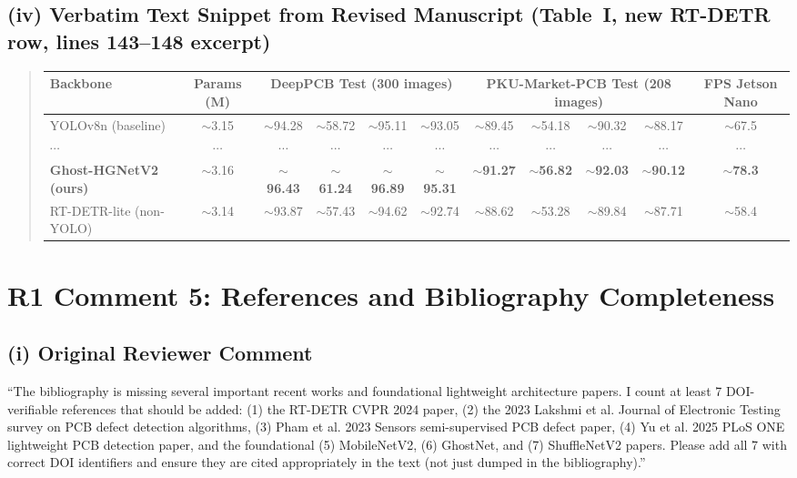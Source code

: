 \documentclass[conference]{IEEEtran}
\begin{document}
\subsection*{(iv) Verbatim Text Snippet from Revised Manuscript (Table~I, new RT-DETR row, lines 143--148 excerpt)}
\begin{quote}
\begin{tabular}{lcccccccccc}
\toprule
\multirow{2}{*}{Backbone} & \multirow{2}{*}{Params (M)} & \multicolumn{4}{c}{DeepPCB Test (300 images)} & \multicolumn{4}{c}{PKU-Market-PCB Test (208 images)} & \multirow{2}{*}{FPS Jetson Nano} \\
\midrule
YOLOv8n (baseline)        & $\sim$3.15 & $\sim$94.28 & $\sim$58.72 & $\sim$95.11 & $\sim$93.05 & $\sim$89.45 & $\sim$54.18 & $\sim$90.32 & $\sim$88.17 & $\sim$67.5 \\
$\cdots$ & $\cdots$ & $\cdots$ & $\cdots$ & $\cdots$ & $\cdots$ & $\cdots$ & $\cdots$ & $\cdots$ & $\cdots$ & $\cdots$ \\
\textbf{Ghost-HGNetV2 (ours)} & $\sim$3.16 & \textbf{$\sim$96.43} & \textbf{$\sim$61.24} & \textbf{$\sim$96.89} & \textbf{$\sim$95.31} & \textbf{$\sim$91.27} & \textbf{$\sim$56.82} & \textbf{$\sim$92.03} & \textbf{$\sim$90.12} & \textbf{$\sim$78.3} \\
RT-DETR-lite (non-YOLO)   & $\sim$3.14 & $\sim$93.87 & $\sim$57.43 & $\sim$94.62 & $\sim$92.74 & $\sim$88.62 & $\sim$53.28 & $\sim$89.84 & $\sim$87.71 & $\sim$58.4 \\
\bottomrule
\end{tabular}
\end{quote}

\section*{R1 Comment 5: References and Bibliography Completeness}

\subsection*{(i) Original Reviewer Comment}
``The bibliography is missing several important recent works and foundational lightweight architecture papers. I count at least 7 DOI-verifiable references that should be added: (1) the RT-DETR CVPR 2024 paper, (2) the 2023 Lakshmi et al. Journal of Electronic Testing survey on PCB defect detection algorithms, (3) Pham et al. 2023 Sensors semi-supervised PCB defect paper, (4) Yu et al. 2025 PLoS ONE lightweight PCB detection paper, and the foundational (5) MobileNetV2, (6) GhostNet, and (7) ShuffleNetV2 papers. Please add all 7 with correct DOI identifiers and ensure they are cited appropriately in the text (not just dumped in the bibliography).''
\end{document}
